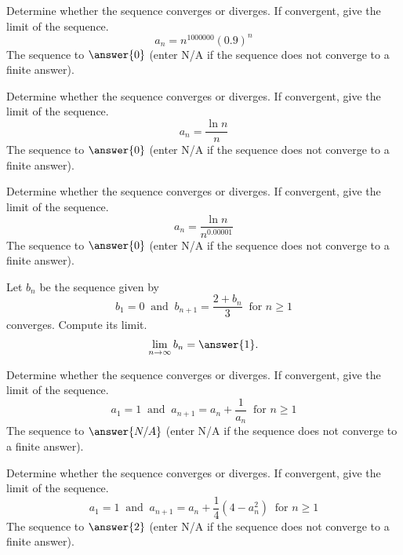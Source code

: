 \documentclass{ximera}
\begin{document}
\begin{exercise}
Determine whether the sequence converges or diverges. If convergent, give the limit of the sequence. 
\[ a_n = n^{1000000} (0.9)^n \]
The sequence  to $\answer{0}$ (enter N/A if the sequence does not converge to a finite answer).
\end{exercise}

\begin{exercise}
Determine whether the sequence converges or diverges. If convergent, give the limit of the sequence. 
\[ a_n = \frac{\ln n}{n} \]
The sequence  to $\answer{0}$ (enter N/A if the sequence does not converge to a finite answer).
\end{exercise}

\begin{exercise}
Determine whether the sequence converges or diverges. If convergent, give the limit of the sequence. 
\[ a_n = \frac{\ln n}{n^{0.00001}} \]
The sequence  to $\answer{0}$ (enter N/A if the sequence does not converge to a finite answer).
\end{exercise}


\begin{exercise}
Let $b_n$ be the sequence given by
\[ b_1 = 0 \ \text{ and } \ b_{n+1} = \frac{2 + b_n}{3} \ \text{ for } n \geq 1 \]
converges. Compute its limit.
\[ \lim_{n \rightarrow \infty} b_n = \answer{1}. \]
\end{exercise}

\begin{exercise}
Determine whether the sequence converges or diverges. If convergent, give the limit of the sequence. 
\[ a_1 = 1 \ \text{ and } \ a_{n+1} = a_n + \frac{1}{a_n} \ \text{ for } n \geq 1 \]
The sequence  to $\answer{N/A}$ (enter N/A if the sequence does not converge to a finite answer).
\end{exercise}

\begin{exercise}
Determine whether the sequence converges or diverges. If convergent, give the limit of the sequence. 
\[ a_1 = 1 \ \text{ and } \ a_{n+1} = a_n + \frac{1}{4} (4 - a_n^2) \ \text{ for } n \geq 1 \]
The sequence  to $\answer{2}$ (enter N/A if the sequence does not converge to a finite answer).

\end{exercise}
\end{document}
